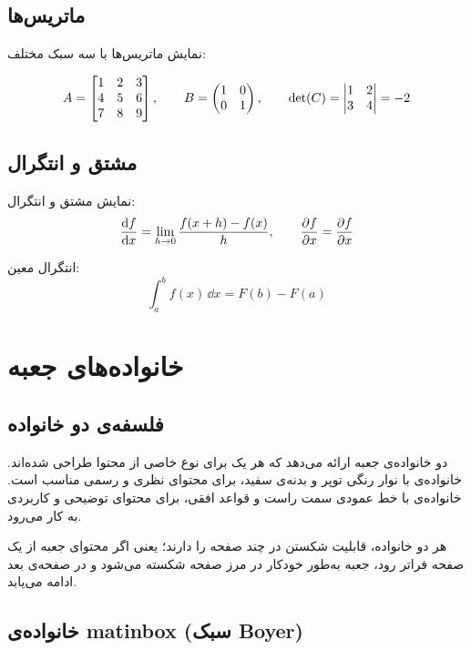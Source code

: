 \documentclass{matinbook}
\begin{document}
\section{ماتریس‌ها}
\label{sec:math-matrices}

نمایش ماتریس‌ها با سه سبک مختلف:

\[
    A = \begin{bmatrix}1 & 2 & 3 \\ 4 & 5 & 6 \\ 7 & 8 & 9\end{bmatrix}, \qquad
    B = \begin{pmatrix}1 & 0 \\ 0 & 1\end{pmatrix}, \qquad
    \det(C) = \begin{vmatrix}1 & 2 \\ 3 & 4\end{vmatrix} = -2
\]

\section{مشتق و انتگرال}
\label{sec:math-derivatives}

نمایش مشتق و انتگرال:
\[
    \frac{\mathrm{d}f}{\mathrm{d}x} = \lim_{h \to 0} \frac{f(x + h) - f(x)}{h}, \qquad
    \frac{\partial f}{\partial x} = \frac{\partial f}{\partial x}
\]

انتگرال معین:
\[
    \int_{a}^{b} f(x) \, \dd{x} = F(b) - F(a)
\]

\chapter{خانواده‌های جعبه}
\label{chap:boxes}

\section{فلسفه‌ی دو خانواده}
\label{sec:box-philosophy}

 دو خانواده‌ی جعبه ارائه می‌دهد که هر یک برای
نوع خاصی از محتوا طراحی شده‌اند. خانواده‌ی  با
نوار رنگی توپر و بدنه‌ی سفید، برای محتوای نظری و رسمی مناسب است.
خانواده‌ی  با خط عمودی سمت راست و قواعد افقی،
برای محتوای توضیحی و کاربردی به کار می‌رود.

هر دو خانواده، قابلیت شکستن در چند صفحه را دارند؛ یعنی اگر
محتوای جعبه از یک صفحه فراتر رود، جعبه به‌طور خودکار در مرز
صفحه شکسته می‌شود و در صفحه‌ی بعد ادامه می‌یابد.

\section{خانواده‌ی matinbox (سبک Boyer)}
\label{sec:box-matinbox}
\end{document}
